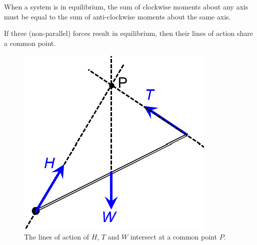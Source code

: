 \begin{principle}
    When a system is in equilibrium, the sum of clockwise moments about any axis must be equal to the sum of anti-clockwise moments about the same axis.    
\end{principle}

If three (non-parallel) forces result in equilibrium, then their lines of action share a common point.

\begin{figure}[H]
    \centering
    \includegraphics[scale=0.4]{media/Equilibrium.png}
    \caption{The lines of action of $H$, $T$ and $W$ intersect at a common point $P$.}
\end{figure}